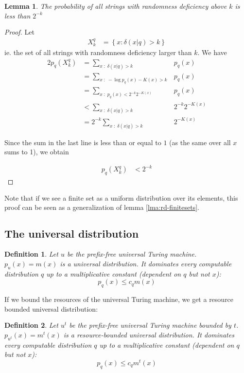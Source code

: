 \documentclass[10pt,a4paper,oneside]{article}
\newtheorem{lma}{Lemma}
\newtheorem{dfn}{Definition}
\begin{document}
\begin{lma}
The probability of all strings with randomness deficiency above $k$ is less than $2^{-k}$
\label{lma:rd-distributions}
\end{lma}

\begin{proof}
Let 
\begin{align*}
X_k^q &= \left\{x : \delta(x|q) > k \right\}
\end{align*}
ie. the set of all strings with randomness deficiency larger than $k$. We have 
\begin{alignat*}{2}
p_q(X_k^q) &= \sum\nolimits_{x\;:\;\delta(x|q)>k} &p_q(x)\\
    &= \sum\nolimits_{x\;:\; -\log p_q(x) - K(x) > k} &p_q(x)\\
    &= \sum\nolimits_{x\;:\;  p_q(x) < 2^{-k}2^{-K(x)}} &p_q(x)\\
    &< \sum\nolimits_{x\;:\;\delta(x|q) > k} &2^{-k} 2^{-K(x)}\\
    &= 2^{-k}\sum\nolimits_{x\;:\;\delta(x|q) > k} &2^{-K(x)}
\end{alignat*}

Since the sum in the last line is less than or equal to $1$ (as the same over all $x$ sums to 1), we obtain

\begin{align*}
p_q(X_k^q) &< 2^{-k}
\end{align*}
\end{proof}

Note that if we see a finite set as a uniform distribution over its elements, this proof can be seen as a generalization of lemma \ref{lma:rd-finitesets}.

\subsection*{The universal distribution}

\begin{dfn}
Let $u$ be the prefix-free universal Turing machine. $p_u(x) = m(x)$ is a \emph{universal distribution}. It dominates every computable distribution $q$ up to a multiplicative constant (dependent on $q$ but not $x$):
\[
p_q(x) \leq c_q m(x)
\]
\label{dfn:universal-distribution}
\end{dfn}

If we bound the resources of the universal Turing machine, we get a resource bounded universal distribution:


\begin{dfn}
Let $u^t$ be the prefix-free universal Turing machine bounded by $t$. $p_{u^t}(x) = m^t(x)$ is a \emph{resource-bounded universal distribution}. It dominates every computable distribution $q$ up to a multiplicative constant (dependent on $q$ but not $x$):
\[
p_q(x) \leq c_q m^t(x)
\]

\label{dfn:resource-bounded-universal-distribution}
\end{dfn}
\end{document}
